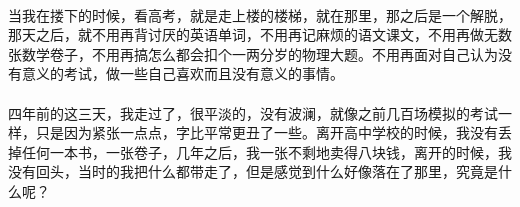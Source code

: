 \documentclass[UTF8]{ctexart}
\begin{document}
          \paragraph{}当我在搂下的时候，看高考，就是走上楼的楼梯，就在那里，那之后是一个解脱，那天之后，就不用再背讨厌的英语单词，不用再记麻烦的语文课文，不用再做无数张数学卷子，不用再搞怎么都会扣个一两分岁的物理大题。不用再面对自己认为没有意义的考试，做一些自己喜欢而且没有意义的事情。
          \paragraph{}四年前的这三天，我走过了，很平淡的，没有波澜，就像之前几百场模拟的考试一样，只是因为紧张一点点，字比平常更丑了一些。离开高中学校的时候，我没有丢掉任何一本书，一张卷子，几年之后，我一张不剩地卖得八块钱，离开的时候，我没有回头，当时的我把什么都带走了，但是感觉到什么好像落在了那里，究竟是什么呢？
\end{document}
